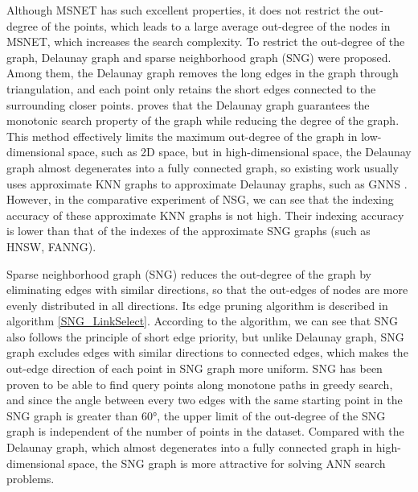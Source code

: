 Although MSNET has such excellent properties, it does not restrict the out-degree of the points, which leads to a large average out-degree of the nodes in MSNET, which increases the search complexity. To restrict the out-degree of the graph, Delaunay graph\cite{aurenhammer1991voronoi} and sparse neighborhood graph (SNG)\cite{DBLP:conf/soda/AryaM93} were proposed. Among them, the Delaunay graph removes the long edges in the graph through triangulation, and each point only retains the short edges connected to the surrounding closer points. \cite{DBLP:journals/tkde/LiZSWLZL20} proves that the Delaunay graph guarantees the monotonic search property of the graph while reducing the degree of the graph. This method effectively limits the maximum out-degree of the graph in low-dimensional space, such as 2D space, but in high-dimensional space, the Delaunay graph almost degenerates into a fully connected graph\cite{DBLP:conf/cvpr/HarwoodD16}, so existing work usually uses approximate KNN graphs to approximate Delaunay graphs, such as GNNS \cite{DBLP:conf/ijcai/HajebiASZ11}. However, in the comparative experiment of NSG, we can see that the indexing accuracy of these approximate KNN graphs is not high. Their indexing accuracy is lower than that of the indexes of the approximate SNG graphs (such as HNSW\cite{DBLP:journals/corr/MalkovY16}, FANNG\cite{DBLP:conf/cvpr/HarwoodD16}). 

Sparse neighborhood graph (SNG) reduces the out-degree of the graph by eliminating edges with similar directions, so that the out-edges of nodes are more evenly distributed in all directions. Its edge pruning algorithm is described in algorithm \ref{SNG_LinkSelect}. According to the algorithm, we can see that SNG also follows the principle of short edge priority, but unlike Delaunay graph, SNG graph excludes edges with similar directions to connected edges, which makes the out-edge direction of each point in SNG graph more uniform. SNG has been proven to be able to find query points along monotone paths in greedy search, and since the angle between every two edges with the same starting point in the SNG graph is greater than 60°, the upper limit of the out-degree of the SNG graph is independent of the number of points in the dataset\cite{DBLP:conf/soda/AryaM93}. Compared with the Delaunay graph, which almost degenerates into a fully connected graph in high-dimensional space, the SNG graph is more attractive for solving ANN search problems.



